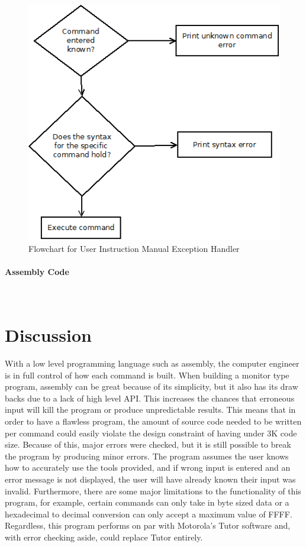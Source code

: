 \documentclass[12pt]{article}
\begin{document}
		
\begin{figure}[H]
\centering
\includegraphics[width=0.7\linewidth]{UserInst}
\caption{Flowchart for User Instruction Manual Exception Handler}
\label{fig:UserInst}
\end{figure}
			\paragraph{Assembly Code}~\\
			
			
			
			\section{Discussion}\label{sec:discussion}
			With a low level programming language such as assembly, the computer engineer is in full control of how each command is built. When building a monitor type program, assembly can be great because of its simplicity, but it also has its draw backs due to a lack of high level API. This increases the chances that erroneous input will kill the program or produce unpredictable results. This means that in order to have a flawless program, the amount of source code needed to be written per command could easily violate the design constraint of having under 3K code size. Because of this, major errors were checked, but it is still possible to break the program by producing minor errors. The program assumes the user knows how to accurately use the tools provided, and if wrong input is entered and an error message is not displayed, the user will have already known their input was invalid. Furthermore, there are some major limitations to the functionality of this program, for example, certain commands can only take in byte sized data or a hexadecimal to decimal conversion can only accept a maximum value of FFFF. Regardless, this program performs on par with Motorola's Tutor software and, with error checking aside, could replace Tutor entirely. 
			
\end{document}
